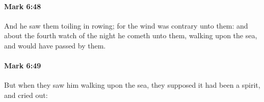 		\paragraph{Mark 6:48} %
			\label{MARK-6-48}

			And he saw them toiling in rowing; for the wind was contrary unto them: and about the fourth watch of the night he cometh unto them, walking upon the sea, and would have passed by them.

			\begin{framed}
			\scriptsize
				\begin{compactdesc}
					\item[SBLG] 
				\end{compactdesc}
			\end{framed}

		\paragraph{Mark 6:49} %
			\label{MARK-6-49}

			But when they saw him walking upon the sea, they supposed it had been a spirit, and cried out:

